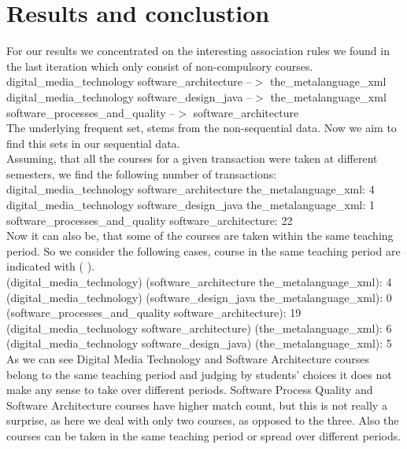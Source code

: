 \section{Results and conclustion}
For our results we concentrated on the interesting association rules we found in the last iteration which only consist of non-compulsory courses.\\

digital\_media\_technology software\_architecture --$>$ the\_metalanguage\_xml\\
digital\_media\_technology software\_design\_java --$>$ the\_metalanguage\_xml\\
software\_processes\_and\_quality --$>$ software\_architecture\\

The underlying frequent set,  stems from the non-sequential data. Now we aim to find this sets in our sequential data.\\

Assuming, that all the courses for a given transaction were taken at different semesters, we find the following number of transactions:\\

digital\_media\_technology software\_architecture the\_metalanguage\_xml:    4\\
digital\_media\_technology software\_design\_java  the\_metalanguage\_xml:    1\\
software\_processes\_and\_quality software\_architecture:                   22\\

Now it can also be, that some of the courses are taken within the same teaching period. So we consider the following cases, course in the same teaching period are indicated with ( ).\\

(digital\_media\_technology) (software\_architecture the\_metalanguage\_xml):        4\\
(digital\_media\_technology) (software\_design\_java  the\_metalanguage\_xml):       0\\
(software\_processes\_and\_quality software\_architecture):                          19\\
(digital\_media\_technology software\_architecture) (the\_metalanguage\_xml):        6\\
(digital\_media\_technology software\_design\_java)  (the\_metalanguage\_xml):       5\\

As we can see Digital Media Technology and Software Architecture courses belong to the same teaching period and judging by students’ choices it does not make any sense to take over different periods. Software Process Quality and Software Architecture courses have higher match count, but this is not really a surprise, as here we deal with only two courses, as opposed to the three. Also the courses can be taken in the same teaching period or spread over different periods.

